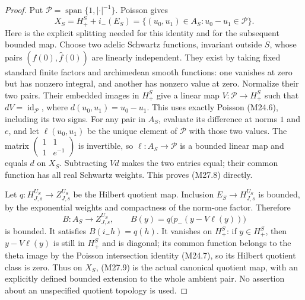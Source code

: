\begin{proof}
Put $\mathcal P=\operatorname{span}\{1,|\cdot|^{-1}\}$.
Poisson gives
\[
 X_S=H_+^S+i_-(E_S)
      =\{(u_0,u_1)\in A_S:u_0-u_1\in\mathcal P\}.
                                                               \tag{M27.8}
\]
Here is the explicit splitting needed for this identity
and for the subsequent bounded map. Choose two adelic
Schwartz functions, invariant outside $S$, whose pairs
$(f(0),\widehat f(0))$ are linearly independent.
They exist by taking fixed standard finite factors
and archimedean smooth functions: one vanishes at
zero but has nonzero integral, and another has
nonzero value at zero. Normalize their two pairs.
Their embedded images in $H_+^S$ give a linear map
$V:\mathcal P\to H_+^S$ such that
$dV=\operatorname{id}_{\mathcal P}$, where
$d(u_0,u_1)=u_0-u_1$. This uses exactly Poisson
(M24.6), including its two signs.
For any pair in $A_S$, evaluate its difference at
norms $1$ and $e$, and let $\ell(u_0,u_1)$ be the
unique element of $\mathcal P$ with those two
values. The matrix
$\left(\begin{smallmatrix}1&1\\1&e^{-1}\end{smallmatrix}\right)$
is invertible, so $\ell:A_S\to\mathcal P$ is a
bounded linear map and equals $d$ on $X_S$.
Subtracting $Vd$ makes the two entries equal;
their common function has all real Schwartz
weights. This proves (M27.8) directly.

Let $q:H_{J,s}^{U_S}\to Z_{J,s}^{U_S}$ be the
Hilbert quotient map. Inclusion $E_S\to H_{J,s}^{U_S}$
is bounded, by the exponential weights and compactness
of the norm-one factor. Therefore
\[
 B:A_S\longrightarrow Z_{J,s}^{U_S},\qquad
 B(y)=q\bigl(p_-(y-V\ell(y))\bigr)
                                                               \tag{M27.9}
\]
is bounded. It satisfies $B(i_-h)=q(h)$.
It vanishes on $H_+^S$: if $y\in H_+^S$, then
$y-V\ell(y)$ is still in $H_+^S$ and is diagonal;
its common function belongs to the theta image
by the Poisson intersection identity (M24.7),
so its Hilbert quotient class is zero.
Thus on $X_S$, (M27.9) is the actual canonical
quotient map, with an explicitly defined bounded
extension to the whole ambient pair. No assertion
about an unspecified quotient topology is used.


\end{proof}
